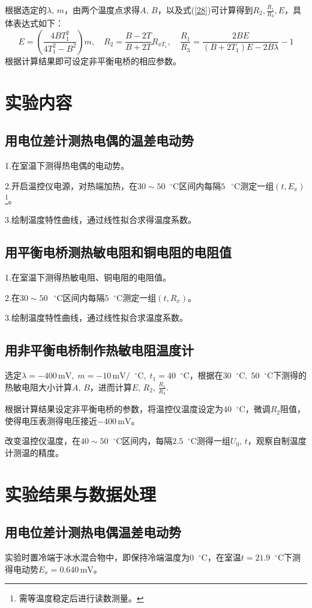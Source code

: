 \documentclass[UTF-8,twoside,cs4size]{ctexart}
\newcommand*{\mcelsius}{\mathop{}\!{^\circ}\mathrm{C}}
\begin{document}
	根据选定的$ \lambda,\,m $，由两个温度点求得$ A,\,B $，以及式(\ref{28})可计算得到$ R_2,\frac{R_1}{R_3},E $，具体表达式如下：
	\[E=\left(\frac{4BT_1^2}{4T_1^2-B^2}\right)m,\quad R_2=\frac{B-2T}{B+2T}R_{xT_1},\quad\frac{R_1}{R_3}=\frac{2BE}{(B+2T_1)E-2B\lambda}-1\]
	根据计算结果即可设定非平衡电桥的相应参数。
	
	\section{实验内容}
	\subsection{用电位差计测热电偶的温差电动势}
	1.在室温下测得热电偶的电动势。
	
	2.开启温控仪电源，对热端加热，在$ 30\sim 50\mcelsius $区间内每隔$ 5\,\mcelsius $测定一组$ (t,E_x) $\footnote{需等温度稳定后进行读数测量。}。
	
	3.绘制温度特性曲线，通过线性拟合求得温度系数。
	\subsection{用平衡电桥测热敏电阻和铜电阻的电阻值}
	1.在室温下测得热敏电阻、铜电阻的电阻值。
	
	2.在$ 30\sim 50\,\mcelsius $区间内每隔$ 5\mcelsius $测定一组$ (t,R_x) $。
	
	3.绘制温度特性曲线，通过线性拟合求温度系数。
	\subsection{用非平衡电桥制作热敏电阻温度计}
	选定$ \lambda = -400\,\mathrm{mV},\; m=-10\,\mathrm{mV/\mcelsius},\; t_1=40\mcelsius $，根据在$ 30\mcelsius,\;50\mcelsius $下测得的热敏电阻大小计算$ A,\,B $，进而计算$ E,\,R_2,\,\frac{R_1}{R_3} $.
	
	根据计算结果设定非平衡电桥的参数，将温控仪温度设定为$ 40\mcelsius $，微调$ R_2 $阻值，使得电压表测得电压接近$ -400\,\mathrm{mV} $。
	
	改变温控仪温度，在$ 40\sim 50\mcelsius $区间内，每隔$ 2.5\mcelsius $测得一组$ U_0,\,t $，观察自制温度计测温的精度。
	
	\section{实验结果与数据处理}
	
	\subsection{用电位差计测热电偶温差电动势}
	实验时置冷端于冰水混合物中，即保持冷端温度为$ 0\mcelsius $，在室温$ t=21.9\mcelsius $下测得电动势$ E_x=0.640\,\mathrm{mV} $。
	
\end{document}
